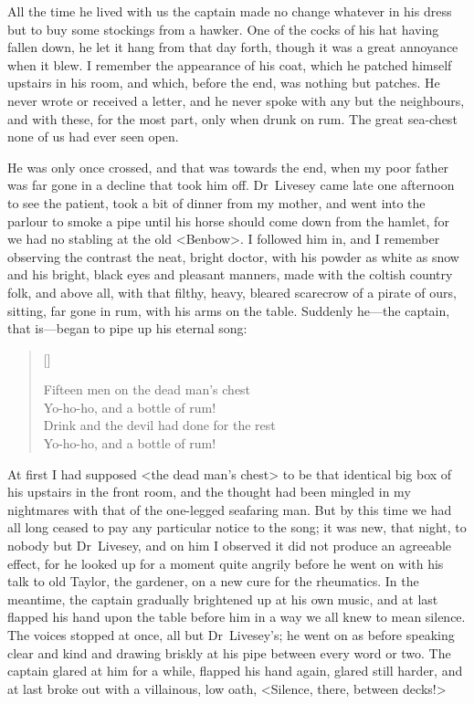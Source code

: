 All the time he lived with us the captain made no change what\-ever in his dress but to buy some stockings from a hawker. One of the cocks of his hat having fallen down, he let it hang from that day forth, though it was a great annoyance when it blew. I remember the appearance of his coat, which he patched himself upstairs in his room, and which, before the end, was nothing but patches. He never wrote or received a letter, and he never spoke with any but the neighbours, and with these, for the most part, only when drunk on rum. The great sea-chest none of us had ever seen open.

He was only once crossed, and that was towards the end, when my poor father was far gone in a decline that took him off. Dr~Livesey came late one afternoon to see the patient, took a bit of dinner from my mother, and went into the parlour to smoke a pipe until his horse should come down from the hamlet, for we had no stabling at the old <Benbow>. I followed him in, and I remember observing the contrast the neat, bright doctor, with his powder as white as snow and his bright, black eyes and pleasant manners, made with the coltish country folk, and above all, with that filthy, heavy, bleared scarecrow of a pirate of ours, sitting, far gone in rum, with his arms on the table. Suddenly he—the captain, that is—began to pipe up his eternal song:

\settowidth{\versewidth}{Drink and the devil had done for the rest\longdash}
\begin{verse}[\versewidth]
\begin{altverse}
Fifteen men on the dead man’s chest\longdash\\
Yo-ho-ho, and a bottle of rum!\\
Drink and the devil had done for the rest\longdash\\
Yo-ho-ho, and a bottle of rum!
\end{altverse}
\end{verse}

At first I had supposed <the dead man's chest> to be that identical big box of his upstairs in the front room, and the thought had been mingled in my nightmares with that of the one-legged seafaring man. But by this time we had all long ceased to pay any particular notice to the song; it was new, that night, to nobody but Dr~Livesey, and on him I observed it did not produce an agreeable effect, for he looked up for a moment quite angrily before he went on with his talk to old Taylor, the gardener, on a new cure for the rheumatics. In the meantime, the captain gradually brightened up at his own music, and at last flapped his hand upon the table before him in a way we all knew to mean silence. The voices stopped at once, all but Dr~Livesey's; he went on as before speaking clear and kind and drawing briskly at his pipe between every word or two. The captain glared at him for a while, flapped his hand again, glared still harder, and at last broke out with a villainous, low oath, <Silence, there, between decks!>

